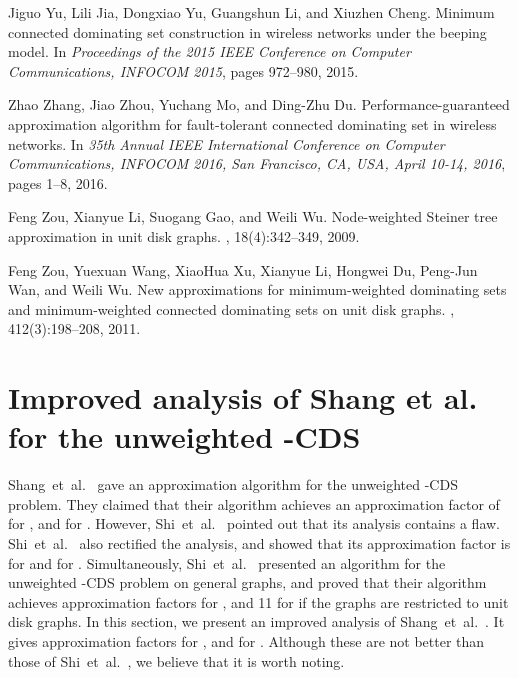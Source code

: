 \documentclass[11pt]{article}
\begin{document}
\begin{thebibliography}{10}
Jiguo Yu, Lili Jia, Dongxiao Yu, Guangshun Li, and Xiuzhen Cheng.
\newblock Minimum connected dominating set construction in wireless networks
  under the beeping model.
\newblock In {\em Proceedings of the 2015 {IEEE} Conference on Computer
  Communications, {INFOCOM} 2015}, pages 972--980, 2015.

Zhao Zhang, Jiao Zhou, Yuchang Mo, and Ding{-}Zhu Du.
\newblock Performance-guaranteed approximation algorithm for fault-tolerant
  connected dominating set in wireless networks.
\newblock In {\em 35th Annual {IEEE} International Conference on Computer
  Communications, {INFOCOM} 2016, San Francisco, CA, USA, April 10-14, 2016},
  pages 1--8, 2016.

Feng Zou, Xianyue Li, Suogang Gao, and Weili Wu.
\newblock Node-weighted {S}teiner tree approximation in unit disk graphs.
, 18(4):342--349, 2009.

Feng Zou, Yuexuan Wang, XiaoHua Xu, Xianyue Li, Hongwei Du, Peng{-}Jun Wan, and
  Weili Wu.
\newblock New approximations for minimum-weighted dominating sets and
  minimum-weighted connected dominating sets on unit disk graphs.
, 412(3):198--208, 2011.

\end{thebibliography}
 
\appendix
\section{Improved analysis of Shang et al. for the unweighted -CDS}
\label{app.rect}

Shang~et~al.\ \cite{Shang:2007jg} gave an
approximation
algorithm for the unweighted -CDS problem.
They claimed that their algorithm achieves an approximation factor of
 for , and  for .
However, Shi~et~al.~\cite{ShiZZW16} pointed out that its analysis
contains a flaw. Shi~et~al.~\cite{ShiZZW16} also rectified the analysis, and showed
that
its approximation factor is  for 
and  for .
Simultaneously, 
Shi~et~al.~\cite{ShiZZW16} presented an algorithm for the unweighted -CDS
problem on general graphs, and proved that their algorithm achieves
approximation factors  for ,
and 11 for  if the graphs are restricted to unit disk graphs.
In this section, we present an improved analysis of  Shang~et~al.~\cite{Shang:2007jg}.
It gives approximation factors 
   for , and 
   for .
Although these are not better than those of 
Shi~et~al.~\cite{ShiZZW16}, we believe that it is worth noting.
  
\end{document}
